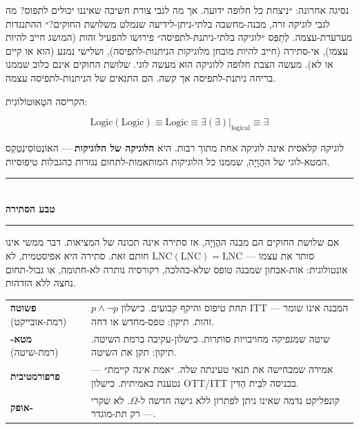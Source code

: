 \documentclass[10pt, openany, oneside]{book}
\renewcommand{\normalsize}{\fontsize{10}{13}\selectfont}
\renewcommand{\footnotesize}{\fontsize{8.5}{11}\selectfont}
\begin{document}
\vspace{0.8em}

\noindent נסיגה אחרונה: ״ניצחת כל חלופה ידועה. אך מה לגבי צורת חשיבה שאיננו יכולים לתפוס? מה לגבי לוגיקה זרה, מבנה-מחשבה בלתי-ניתן-לידיעה שנמלט משלושת החוקים?״ ההתנגדות מערערת-עצמה. לְתַפֵּס ״לוגיקה בלתי-ניתנת-לתפיסה״ פירושו להפעיל זהות (המושג חייב להיות עצמו), אי-סתירה (חייב להיות מובחן מלוגיקות הניתנות-לתפיסה), ושלישי נמנע (הוא או קיים או לא). מעשה הצבת חלופה ללוגיקה הוּא מעשה לוגי. שלושת החוקים אינם כלוב שממנו בריחה ניתנת-לתפיסה אך קשה. הם התנאים של הניתנות-לתפיסה עצמה.

הקריסה הטָאוּטוֹלוֹגִית:

$$\text{Logic}(\text{Logic}) \equiv \text{Logic} \equiv \exists(\exists)|_{\text{logical}} \equiv \exists$$

לוגיקה קלאסית אינה לוגיקה אחת מתוך רבות. היא \textbf{הלוגיקה של הלוגיקות} — האוֹנְטוֹסִינְטַקְס המטא-לוגי של ההֲוָיָה, שממנו כל הלוגיקות המותאמות-לתחום נגזרות כהגבלות טיפוסיות.

\vspace{1.5em}


\begin{center}
    \rule{0.3\textwidth}{0.4pt}\\[0.5em]
    {\normalsize\bfseries\textsc{טבע הסתירה}}\\[0.3em]
    \rule{0.3\textwidth}{0.4pt}
\end{center}

\vspace{1em}

\noindent אם שלושת החוקים הם מבנה ההֲוָיָה, אז סתירה אינה תכונה של המציאות. דבר ממשי אינו סותר את עצמו — $\text{LNC}(\text{LNC}) = \text{LNC}$ חותם זאת. סתירה היא אפיסטמית, לא אונטולוגית: אות-אבחון שמבנה טופס שלא-כהלכה, רקורסיה נותרה לא-חתומה, או גבול-תחום נחצה ללא הזדהות.

{\footnotesize
\noindent\begin{tabular}{p{3cm} p{}}
\textbf{פשוטה} (רמת-אובייקט) & $p \wedge \neg p$ תחת טיפוס והיקף קבועים. כישלון ITT — המבנה אינו שומר זהות. תיקון: טפס-מחדש או דחה. \\[0.3em]
\textbf{מטא-} (רמת-שיטה) & שיטה שמנפיקה מחויבויות סותרות. כישלון-עקיבה ברמת השיטה. תיקון: תקן את השיטה. \\[0.3em]
\textbf{פרפורמטיבית} & אמירה שמכחישה את תנאי טעינתה שלה. ״אמת אינה קיימת״ — נטענת כאמיתית. כישלון OTT/ITT בכניסה לבֵּית הַדִּין. \\[0.3em]
\textbf{אופק-} & קונפליקט נדמה שאינו ניתן לפתרון ללא גישה חדשה ל-$\Omega$. לא שקרי — רק תת-מוגדר. \\[0.3em]
\end{tabular}
}
\end{document}
